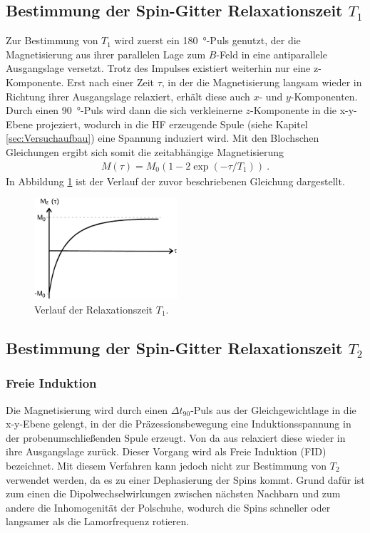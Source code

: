 \subsection{Bestimmung der Spin-Gitter Relaxationszeit $T_1$}
Zur Bestimmung von $T_1$ wird zuerst ein \SI{180}{\degree}-Puls genutzt, der die Magnetisierung aus ihrer parallelen Lage zum $B$-Feld  in eine antiparallele Ausgangslage versetzt. Trotz des Impulses existiert weiterhin nur eine z-Komponente. Erst nach einer Zeit $\tau$, in der die Magnetisierung langsam wieder in Richtung ihrer Ausgangslage relaxiert, erhält diese auch $x$- und $y$-Komponenten. Durch einen  \SI{90}{\degree}-Puls wird dann die sich verkleinerne $z$-Komponente in die x-y-Ebene projeziert, wodurch in die HF erzeugende Spule (siehe Kapitel \ref{sec:Versuchaufbau}) eine Spannung induziert wird. Mit den Blochschen Gleichungen ergibt sich somit die zeitabhängige Magnetisierung
\begin{align}
	M(\tau)=M_0(1-2\exp{(-\tau/T_1)}) \: .
	\label{eq:30}
\end{align}
In Abbildung \ref{fig:plot1} ist der Verlauf der zuvor beschriebenen Gleichung dargestellt.

\begin{figure}[H]
  \centering
  \includegraphics[width=0.475\textwidth]{ressources/T_1_plot.png}
  \caption{Verlauf der Relaxationszeit $T_1$.}
  \label{fig:plot1}
\end{figure}

\subsection{Bestimmung der Spin-Gitter Relaxationszeit $T_2$}
\subsubsection{Freie Induktion}
Die Magnetisierung wird durch einen $\Delta t_{90}$-Puls aus der Gleichgewichtlage in die x-y-Ebene gelengt, in der die Präzessionsbewegung eine Induktionsspannung in der probenumschließenden Spule erzeugt. Von da aus relaxiert diese wieder in ihre Ausgangslage zurück. Dieser Vorgang wird als Freie Induktion (FID) bezeichnet. Mit diesem Verfahren kann jedoch nicht zur Bestimmung von $T_2$ verwendet werden, da es zu einer Dephasierung der Spins kommt. Grund dafür ist zum einen die Dipolwechselwirkungen zwischen nächsten Nachbarn und zum andere die Inhomogenität der Polschuhe, wodurch die Spins schneller oder langsamer als die Lamorfrequenz rotieren.

